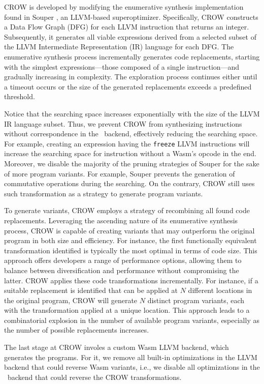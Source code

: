 CROW is developed by modifying the enumerative synthesis implementation found in Souper \cite{Sasnauskas2017Souper:Superoptimizer}, an LLVM-based superoptimizer. 
Specifically, CROW constructs a Data Flow Graph (DFG) for each LLVM instruction that returns an integer. 
Subsequently, it generates all viable expressions derived from a selected subset of the LLVM Intermediate Representation (IR) language for each DFG.
The enumerative synthesis process incrementally generates code replacements, starting with the simplest expressions—those composed of a single instruction—and gradually increasing in complexity. 
The exploration process continues either until a timeout occurs or the size of the generated replacements exceeds a predefined threshold.

Notice that the searching space increases exponentially with the size of the LLVM IR language subset. Thus,
we prevent CROW from synthesizing instructions without correspondence in the \wasm\ backend, effectively reducing the searching space. 
For example, creating an expression having the  \texttt{freeze} LLVM instructions will increase the searching space for instruction without a Wasm's opcode in the end.
Moreover, we disable the majority of the pruning strategies of Souper for the sake of more program variants.
For example, Souper prevents the generation of commutative operations during the searching.
On the contrary, CROW still uses such transformation as a strategy to generate program variants. 


To generate variants, CROW employs a strategy of recombining all found code replacements. 
Leveraging the ascending nature of its enumerative synthesis process, CROW is capable of creating variants that may outperform the original program in both size and efficiency. 
For instance, the first functionally equivalent transformation identified is typically the most optimal in terms of code size. 
This approach offers developers a range of performance options, allowing them to balance between diversification and performance without compromising the latter.
CROW applies these code transformations incrementally. 
For instance, if a suitable replacement is identified that can be applied at $N$ different locations in the original program, CROW will generate $N$ distinct program variants, each with the transformation applied at a unique location. 
This approach leads to a combinatorial explosion in the number of available program variants, especially as the number of possible replacements increases.

The last stage at CROW involes a custom Wasm LLVM backend, which generates the \wasm programs.
For it, we remove all built-in optimizations in the LLVM backend that could reverse Wasm variants, i.e., we disable all optimizations in the \wasm\ backend that could reverse the CROW transformations.

